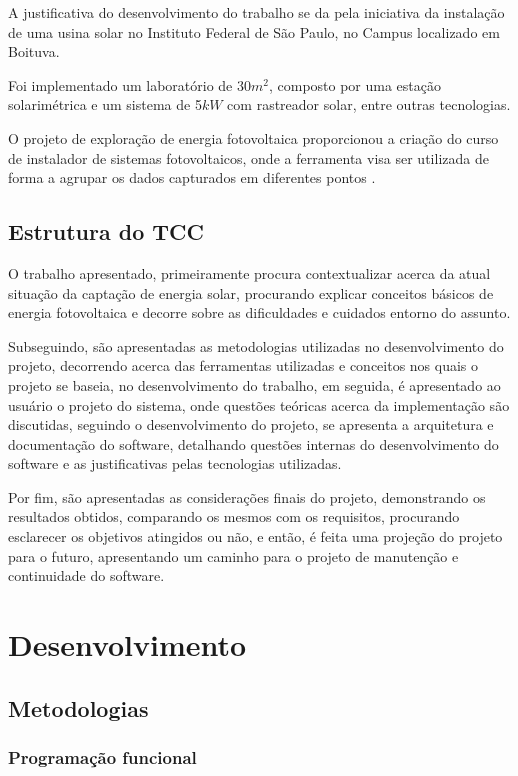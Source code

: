 A justificativa do desenvolvimento do trabalho se da pela iniciativa da instalação de uma usina solar no Instituto Federal de São Paulo, no Campus localizado em Boituva.

Foi implementado um laboratório de 30$m^2$, composto por uma estação solarimétrica e um sistema de 5$kW$ com rastreador solar, entre outras tecnologias.

O projeto de exploração de energia fotovoltaica proporcionou a criação do curso de instalador de sistemas fotovoltaicos, onde a ferramenta visa ser utilizada de forma a agrupar os dados capturados em diferentes pontos \cite{solar_ifsp_btv}.

\section{Estrutura do TCC}

O trabalho apresentado, primeiramente procura contextualizar acerca da atual situação da captação de energia solar, procurando explicar conceitos básicos de energia fotovoltaica e decorre sobre as dificuldades e cuidados entorno do assunto.

Subseguindo, são apresentadas as metodologias utilizadas no desenvolvimento do projeto, decorrendo acerca das ferramentas utilizadas e conceitos nos quais o projeto se baseia, no desenvolvimento do trabalho, em seguida, é apresentado ao usuário o projeto do sistema, onde questões teóricas acerca da implementação são discutidas, seguindo o desenvolvimento do projeto, se apresenta a arquitetura e documentação do software, detalhando questões internas do desenvolvimento do software e as justificativas pelas tecnologias utilizadas.

Por fim, são apresentadas as considerações finais do projeto, demonstrando os resultados obtidos, comparando os mesmos com os requisitos, procurando esclarecer os objetivos atingidos ou não, e então, é feita uma projeção do projeto para o futuro, apresentando um caminho para o projeto de manutenção e continuidade do software.

\chapter{Desenvolvimento}

\section{Metodologias}

\subsection{Programação funcional}

